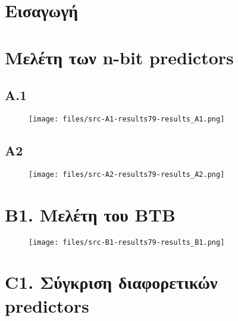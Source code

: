 \documentclass[a4paper,12pt]{article}
\begin{document}
\def\thesection {\roman{section}: }
\def\thesubsection {\Roman{subsection}) }



\section{Εισαγωγή}

\section{Μελέτη των n-bit predictors}

\subsection{A.1}

\begin{figure}[H]
    \centering
    \texttt{[image: files/src-A1-results79-results\_A1.png]}
    \caption{}
\end{figure}



\pagebreak


\subsection{A2}

\begin{figure}[H]
    \centering
    \texttt{[image: files/src-A2-results79-results\_A2.png]}
    \caption{}
\end{figure}



\section{B1. Μελέτη του BTB}

\begin{figure}[H]
    \centering
    \texttt{[image: files/src-B1-results79-results\_B1.png]}
    \caption{}
\end{figure}



\section{C1. Σύγκριση διαφορετικών predictors}
\end{document}
